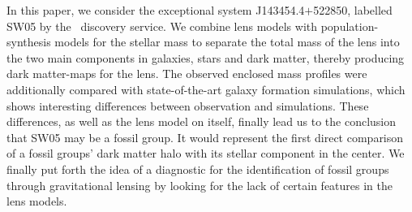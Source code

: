 \noindent In this paper, we consider the exceptional system J143454.4$+$522850,
labelled SW05 by the \SW~discovery service.  We combine lens models with
population-synthesis models for the stellar mass to separate the total mass of
the lens into the two main components in galaxies, stars and dark matter,
thereby producing dark matter-maps for the lens.  The observed enclosed mass
profiles were additionally compared with state-of-the-art galaxy formation
simulations, which shows interesting differences between observation and
simulations.  These differences, as well as the lens model on itself, finally
lead us to the conclusion that SW05 may be a fossil group.  It would represent
the first direct comparison of a fossil groups' dark matter halo with its
stellar component in the center.  We finally put forth the idea of a diagnostic
for the identification of fossil groups through gravitational lensing by looking
for the lack of certain features in the lens models.
%

\clearpage
  

  

  

  

  


